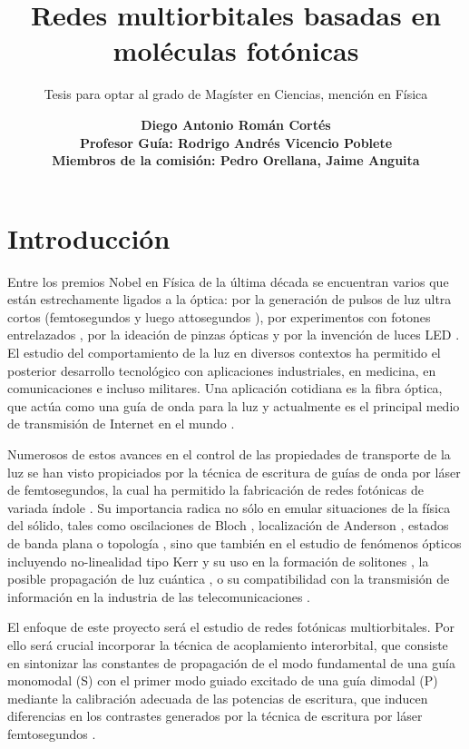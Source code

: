 \documentclass[12pt, letterpaper]{article}
\date{\textbf{Diego Antonio Román Cortés\\ Profesor Guía: Rodrigo Andrés Vicencio Poblete \\ Miembros de la comisión: Pedro Orellana, Jaime Anguita}}
\author{Tesis para optar al grado de Magíster en Ciencias, mención en Física}
\title{Redes multiorbitales basadas en moléculas fotónicas}
\begin{document}
 \maketitle
\justifying
\section{Introducción}

Entre los premios Nobel en Física de la última década \cite{nobel} se encuentran varios que están estrechamente ligados a la óptica: por la generación de pulsos de luz ultra cortos (femtosegundos \cite{femto1} y luego attosegundos \cite{atto1, atto2, atto3}), por experimentos con fotones entrelazados \cite{photons1, photons2, photons3}, por la ideación de pinzas ópticas \cite{opticaltweezers} y por la invención de luces LED \cite{led1, led2, led3}. El estudio del comportamiento de la luz en diversos contextos ha permitido el posterior desarrollo tecnológico con aplicaciones industriales, en medicina, en comunicaciones e incluso militares. Una aplicación cotidiana es la fibra óptica, que actúa como una guía de onda para la luz y actualmente es el principal medio de transmisión de Internet en el mundo \cite{fibra2, fibra}. 
	
	Numerosos de estos avances en el control de las propiedades de transporte de la luz se han visto propiciados por la técnica de escritura de guías de onda por láser de femtosegundos, la cual ha permitido la fabricación de redes fotónicas de variada índole \cite{femto, bics, lieb1, lieb2, artificialFB, FBdynamics, strain, dendritas, splitters}. Su importancia radica no sólo en emular situaciones de la física del sólido, tales como oscilaciones de Bloch \cite{BlochOsci}, localización de Anderson \cite{Anderson}, estados de banda plana \cite{lieb1, lieb2, artificialFB, FBdynamics} o topología \cite{obstopo, obsfloquet, topo1dphoto,toporusos}, sino que también en el estudio de fenómenos ópticos incluyendo no-linealidad tipo Kerr y su uso en la formación de solitones \cite{discretesolitons}, la posible propagación de luz cuántica \cite{qed, squeezed, topoquantum}, o su compatibilidad con la transmisión de información en la industria de las telecomunicaciones \cite{telecom}.
	
	El enfoque de este proyecto será el estudio de redes fotónicas multiorbitales. Por ello será crucial incorporar la técnica de acoplamiento interorbital, que consiste en sintonizar las constantes de propagación de el modo fundamental de una guía monomodal (S) con el primer modo guiado excitado de una guía dimodal (P) mediante la calibración adecuada de las potencias de escritura, que inducen diferencias en los contrastes generados por la técnica de escritura por láser femtosegundos \cite{interorbital}.
	
\end{document}
